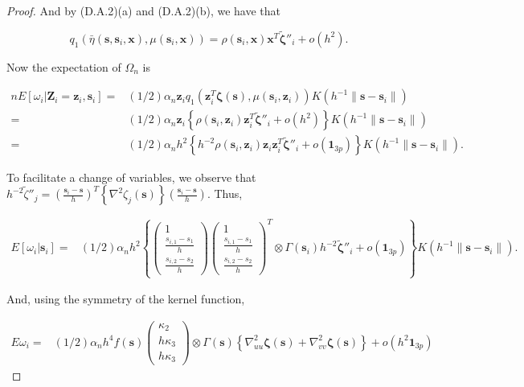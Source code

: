 \documentclass[12pt,english,authoryear, review]{article}\usepackage[]{graphicx}\usepackage[]{color}
\theoremstyle{plain}
\theoremstyle{plain}
\begin{document}
\begin{proof}
And by (D.A.2)(a) and (D.A.2)(b), we have that

\[
q_{1}\left(\bar{\eta}\left(\bm{s},\bm{s}_{i},\bm{x}\right),\mu\left(\bm{s}_{i},\bm{x}\right)\right)=\rho\left(\bm{s}_{i},\bm{x}\right)\bm{x}^{T}\tilde{\bm{\zeta}}''_{i}+o\left(h^{2}\right).
\]


Now the expectation of $\Omega_{n}$ is 

\begin{align*}
nE\left[\omega_{i}|\bm{Z}_{i}=\bm{z}_{i},\bm{s}_{i}\right]= & \left(1/2\right)\alpha_{n}\bm{z}_{i}q_{1}\left(\bm{z}_{i}^{T}\bm{\zeta}\left(\bm{s}\right),\mu\left(\bm{s}_{i},\bm{z}_{i}\right)\right)K\left(h^{-1}\|\bm{s}-\bm{s}_{i}\|\right)\\
= & \left(1/2\right)\alpha_{n}\bm{z}_{i}\left\{ \rho\left(\bm{s}_{i},\bm{z}_{i}\right)\bm{z}_{i}^{T}\tilde{\bm{\zeta}}''_{i}+o\left(h^{2}\right)\right\} K\left(h^{-1}\|\bm{s}-\bm{s}_{i}\|\right)\\
= & \left(1/2\right)\alpha_{n}h^{2}\left\{ h^{-2}\rho\left(\bm{s}_{i},\bm{z}_{i}\right)\bm{z}_{i}\bm{z}_{i}^{T}\tilde{\bm{\zeta}}''_{i}+o\left(\bm{1}_{3p}\right)\right\} K\left(h^{-1}\|\bm{s}-\bm{s}_{i}\|\right).
\end{align*}


To facilitate a change of variables, we observe that $h^{-2}\tilde{\zeta}''_{j}=\left(\frac{\bm{s}_{i}-\bm{s}}{h}\right)^{T}\left\{ \nabla^{2}\zeta_{j}\left(\bm{s}\right)\right\} \left(\frac{\bm{s}_{i}-\bm{s}}{h}\right)$.
Thus,

\begin{align*}
E\left[\omega_{i}|\bm{s}_{i}\right]= & \left(1/2\right)\alpha_{n}h^{2}\left\{ \left(\begin{array}{c}
1\\
\frac{s_{i,1}-s_{1}}{h}\\
\frac{s_{i,2}-s_{2}}{h}
\end{array}\right)\left(\begin{array}{c}
1\\
\frac{s_{i,1}-s_{1}}{h}\\
\frac{s_{i,2}-s_{2}}{h}
\end{array}\right)^{T}\otimes\Gamma\left(\bm{s}_{i}\right)h^{-2}\tilde{\bm{\zeta}}''_{i}+o\left(\bm{1}_{3p}\right)\right\} K\left(h^{-1}\|\bm{s}-\bm{s}_{i}\|\right).
\end{align*}


And, using the symmetry of the kernel function,

\begin{align*}
E\omega_{i}= & \left(1/2\right)\alpha_{n}h^{4}f\left(\bm{s}\right)\left(\begin{array}{c}
\kappa_{2}\\
h\kappa_{3}\\
h\kappa_{3}
\end{array}\right)\otimes\Gamma\left(\bm{s}\right)\left\{ \nabla_{uu}^{2}\bm{\zeta}\left(\bm{s}\right)+\nabla_{vv}^{2}\bm{\zeta}\left(\bm{s}\right)\right\} +o\left(h^{2}\bm{1}_{3p}\right)
\end{align*}



\end{proof}
\end{document}

